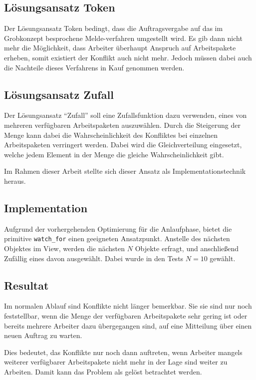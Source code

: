 \subsection{Lösungsansatz Token}
Der Lösungsansatz Token bedingt, dass die Auftragsvergabe auf das im Grobkonzept besprochene Melde-verfahren umgestellt wird.
Es gib dann nicht mehr die Möglichkeit, dass Arbeiter überhaupt Anspruch auf Arbeitspakete erheben, somit existiert der Konflikt auch nicht mehr.
Jedoch müssen dabei auch die Nachteile dieses Verfahrens in Kauf genommen werden.

\subsection{Lösungsansatz Zufall}

Der Lösungsansatz ``Zufall'' soll eine Zufallsfunktion dazu verwenden,
eines von mehreren verfügbaren Arbeitspaketen auszuwählen.
Durch die Steigerung der Menge kann dabei die Wahrscheinlichkeit des Konfliktes bei einzelnen Arbeitspaketen verringert werden. Dabei wird die Gleichverteilung eingesetzt, welche jedem Element in der Menge die gleiche Wahrscheinlichkeit gibt.

Im Rahmen dieser Arbeit stellte sich dieser Ansatz als Implementationstechnik heraus.


\subsection{Implementation}

Aufgrund der vorhergehenden Optimierung für die Anlaufphase,
bietet die primitive \verb|watch_for| einen geeigneten Ansatzpunkt.
Anstelle des nächsten Objektes im View, werden die nächsten $N$ Objekte erfragt,
und anschließend Zufällig eines davon ausgewählt.
Dabei wurde in den Tests $N = 10$ gewählt.

\subsection{Resultat}
Im normalen Ablauf sind Konflikte nicht länger bemerkbar.
Sie sie sind nur noch feststellbar, wenn die Menge der verfügbaren Arbeitspakete
sehr gering ist oder bereits mehrere Arbeiter dazu übergegangen sind,
auf eine Mitteilung über einen neuen Auftrag zu warten.

Dies bedeutet, das Konflikte nur noch dann auftreten,
wenn Arbeiter mangels weiterer verfügbarer Arbeitspakete nicht mehr in der Lage sind weiter zu Arbeiten. Damit kann das Problem als gelöst betrachtet werden.

